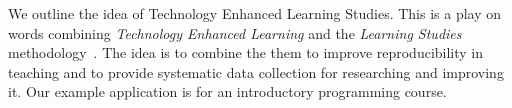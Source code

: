 
We outline the idea of Technology Enhanced Learning Studies.
This is a play on words combining \emph{Technology Enhanced Learning} and the 
\emph{Learning Studies} methodology~\cite{LearningStudy}.
The idea is to combine the them to improve reproducibility in teaching and to 
provide systematic data collection for researching and improving it.
Our example application is for an introductory programming course.

